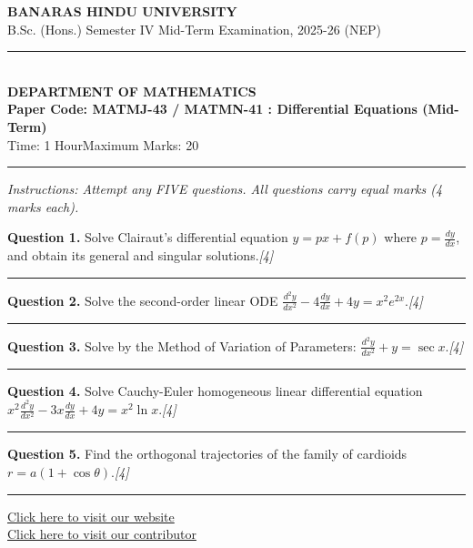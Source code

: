 \documentclass[11pt,a4paper]{article}
\newcommand{\pts}[1]{\hfill   \textit{[#1]}}
\begin{document}
\begin{center}
  {\large\bfseries BANARAS HINDU UNIVERSITY}\\[2pt]
  {\normalsize B.Sc. (Hons.) Semester IV Mid-Term Examination, 2025-26 (NEP)}\\[6pt]
  \rule{0.8\linewidth}{0.5pt}\\[6pt]
  {\large\bfseries DEPARTMENT OF MATHEMATICS}\\[4pt]
  {\large\bfseries Paper Code: MATMJ-43 / MATMN-41 : Differential Equations (Mid-Term)}\\[4pt]
  {\normalsize Time: 1 Hour\hfill Maximum Marks: 20}
\end{center}

\rule{\linewidth}{0.4pt}

\smallskip



\noindent   \textit{Instructions: Attempt any FIVE questions. All questions carry equal marks (4 marks each).}

\bigskip




\noindent   \textbf{Question 1.} Solve Clairaut's differential equation $y = px + f(p)$ where $p = \frac{dy}{dx}$, and obtain its general and singular solutions.\pts{4}

\medskip\rule{\linewidth}{0.2pt}\medskip




\noindent   \textbf{Question 2.} Solve the second-order linear ODE $\frac{d^2 y}{dx^2} - 4\frac{dy}{dx} + 4y = x^2 e^{2x}$.\pts{4}

\medskip\rule{\linewidth}{0.2pt}\medskip




\noindent   \textbf{Question 3.} Solve by the Method of Variation of Parameters: $\frac{d^2 y}{dx^2} + y = \sec x$.\pts{4}

\medskip\rule{\linewidth}{0.2pt}\medskip




\noindent   \textbf{Question 4.} Solve Cauchy-Euler homogeneous linear differential equation $x^2 \frac{d^2 y}{dx^2} - 3x \frac{dy}{dx} + 4y = x^2 \ln x$.\pts{4}

\medskip\rule{\linewidth}{0.2pt}\medskip




\noindent   \textbf{Question 5.} Find the orthogonal trajectories of the family of cardioids $r = a(1 + \cos \theta)$.\pts{4}

\vfill
\rule{\linewidth}{0.4pt}

\begin{center}\small
\href{https://bhu-exam.vercel.app/}{Click here to visit our website}\\[4pt]
\href{https://me-aryan.vercel.app/}{Click here to visit our contributor}
\end{center}
\end{document}
